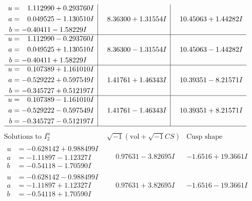 \documentclass[1p]{elsarticle_modified}
\theoremstyle{definition}
\newcommand{\I}{\sqrt{-1}}
\begin{document}
$$\begin{array}{c|c|c}
\begin{aligned}
u &= \phantom{-}1.112990 + 0.293760 I \\
a &= \phantom{-}0.049525 - 1.130510 I \\
b &= -0.40411 - 1.58229 I\end{aligned}
 & \phantom{-}8.36300 + 1.31554 I & \phantom{-}10.45063 + 1.44282 I \\ \hline\begin{aligned}
u &= \phantom{-}1.112990 - 0.293760 I \\
a &= \phantom{-}0.049525 + 1.130510 I \\
b &= -0.40411 + 1.58229 I\end{aligned}
 & \phantom{-}8.36300 - 1.31554 I & \phantom{-}10.45063 - 1.44282 I \\ \hline\begin{aligned}
u &= \phantom{-}0.107389 + 1.161010 I \\
a &= -0.529222 + 0.597549 I \\
b &= -0.345727 + 0.512197 I\end{aligned}
 & \phantom{-}1.41761 + 1.46343 I & \phantom{-}10.39351 - 8.21571 I \\ \hline\begin{aligned}
u &= \phantom{-}0.107389 - 1.161010 I \\
a &= -0.529222 - 0.597549 I \\
b &= -0.345727 - 0.512197 I\end{aligned}
 & \phantom{-}1.41761 - 1.46343 I & \phantom{-}10.39351 + 8.21571 I\\
 \hline 
 \end{array}$$\newpage$$\begin{array}{c|c|c}  
\text{Solutions to }I^u_{2}& \I (\text{vol} + \sqrt{-1}CS) & \text{Cusp shape}\\
 \hline 
\begin{aligned}
u &= -0.628142 + 0.988499 I \\
a &= -1.11897 - 1.12327 I \\
b &= -0.54118 - 1.70590 I\end{aligned}
 & \phantom{-}0.97631 - 3.82695 I & -1.6516 + 19.3661 I \\ \hline\begin{aligned}
u &= -0.628142 - 0.988499 I \\
a &= -1.11897 + 1.12327 I \\
b &= -0.54118 + 1.70590 I\end{aligned}
 & \phantom{-}0.97631 + 3.82695 I & -1.6516 - 19.3661 I \\ \hline\begin{aligned}

\end{aligned}
\end{array}$$
\end{document}
